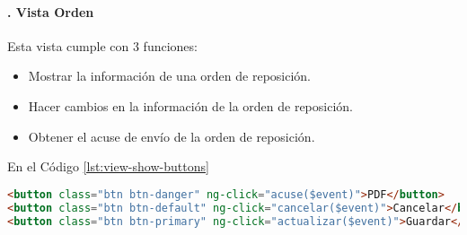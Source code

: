 \paragraph{. Vista Orden\\}
Esta vista cumple con 3 funciones:
\begin{itemize}
	\item Mostrar la información de una orden de reposición.
	\item Hacer cambios en la información de la orden de reposición.
	\item Obtener el acuse de envío de la orden de reposición.
\end{itemize}
En el Código \ref{lst:view-show-buttons}
\begin{lstlisting}[language=HTML, captionpos=b, caption={Controles de la vista de orden de reposición.}, label={lst:view-show-buttons}]
<button class="btn btn-danger" ng-click="acuse($event)">PDF</button>
<button class="btn btn-default" ng-click="cancelar($event)">Cancelar</button>
<button class="btn btn-primary" ng-click="actualizar($event)">Guardar</button>
\end{lstlisting}

